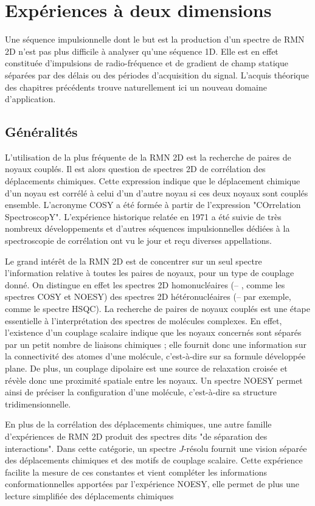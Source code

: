 \chapter[RMN 2D]{Expériences à deux dimensions}

Une séquence impulsionnelle dont le but est la production d'un spectre de RMN 2D
n'est pas plus difficile à analyser qu'une séquence 1D.
Elle est en effet constituée d'impulsions de radio-fréquence et
de gradient de champ statique séparées par des délais
ou des périodes d'acquisition du signal.
L'acquis théorique des chapitres précédents trouve naturellement
ici un nouveau domaine d'application.

\section{Généralités}
\label{sec:2d:gen}
L'utilisation de la plus fréquente de la RMN 2D est
la recherche de paires de noyaux couplés.
Il est alors question de spectres 2D de corrélation des déplacements chimiques.
Cette expression indique que le déplacement chimique d'un noyau
est corrélé à celui d'un d'autre noyau si ces deux noyaux sont couplés ensemble.
L'acronyme COSY a été formée à partir de l'expression "COrrelation SpectroscopY".
L'expérience historique relatée en 1971 a été suivie de très nombreux
développements et d'autres séquences impulsionnelles dédiées à la spectroscopie de 
corrélation ont vu le jour et reçu diverses appellations.

Le grand intérêt de la RMN 2D est de concentrer sur un seul spectre l'information
relative à toutes les paires de noyaux, pour un type de couplage donné.
On distingue en effet les spectres 2D homonucléaires (\prot -- \prot, comme les spectres COSY et NOESY)
des spectres 2D hétéronucléaires (\prot -- \carb par exemple, comme le spectre HSQC).
La recherche de paires de noyaux couplés est une étape essentielle à
l'interprétation des spectres de molécules complexes.
En effet, l'existence
d'un couplage scalaire indique que les noyaux concernés sont séparés par un
petit nombre de liaisons chimiques ; elle fournit donc une information
sur la connectivité des atomes d'une molécule, c'est-à-dire sur sa formule
développée plane.
De plus, un couplage dipolaire est une source de relaxation croisée
et révèle donc une proximité spatiale entre les noyaux.
Un spectre NOESY permet ainsi de préciser la configuration d'une molécule,
c'est-à-dire sa structure tridimensionnelle.

En plus de la corrélation des déplacements chimiques,
une autre famille d'expériences de RMN 2D produit des spectres
dits "de séparation des interactions".
Dans cette catégorie, un spectre $J$-résolu fournit une vision
séparée des déplacements chimiques
et des motifs de couplage scalaire. 
Cette expérience facilite la mesure
de ces constantes et vient compléter les informations conformationnelles apportées
par l'expérience NOESY, elle permet
de plus une lecture simplifiée des déplacements chimiques

